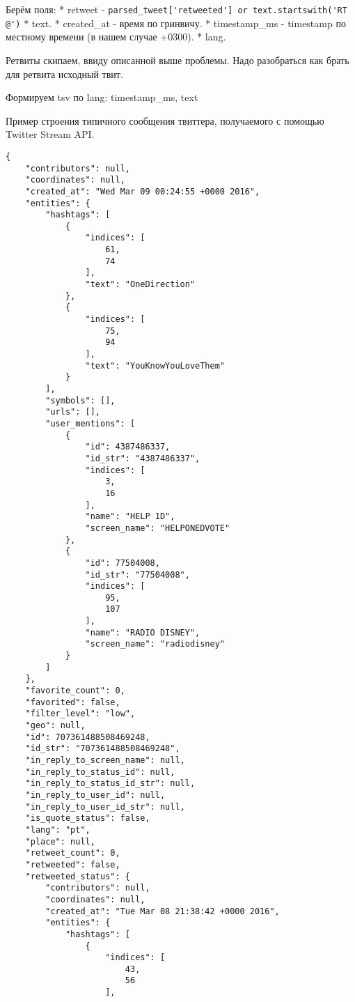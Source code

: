         Берём поля:
        * retweet - \lstinline{parsed_tweet['retweeted'] or text.startswith('RT @')}
        * text.
        * created\_at - время по гринвичу.
        * timestamp\_ms - timestamp по местному времени (в нашем случае +0300).
        * lang.

        Ретвиты скипаем, ввиду описанной выше проблемы. Надо разобраться как брать для ретвита исходный твит.

        Формируем tsv по lang:
        timestamp\_ms, text

        Пример строения типичного сообщения твиттера, получаемого с помощью Twitter Stream API.
\begin{lstlisting}
{
    "contributors": null,
    "coordinates": null,
    "created_at": "Wed Mar 09 00:24:55 +0000 2016",
    "entities": {
        "hashtags": [
            {
                "indices": [
                    61,
                    74
                ],
                "text": "OneDirection"
            },
            {
                "indices": [
                    75,
                    94
                ],
                "text": "YouKnowYouLoveThem"
            }
        ],
        "symbols": [],
        "urls": [],
        "user_mentions": [
            {
                "id": 4387486337,
                "id_str": "4387486337",
                "indices": [
                    3,
                    16
                ],
                "name": "HELP 1D",
                "screen_name": "HELPONEDVOTE"
            },
            {
                "id": 77504008,
                "id_str": "77504008",
                "indices": [
                    95,
                    107
                ],
                "name": "RADIO DISNEY",
                "screen_name": "radiodisney"
            }
        ]
    },
    "favorite_count": 0,
    "favorited": false,
    "filter_level": "low",
    "geo": null,
    "id": 707361488508469248,
    "id_str": "707361488508469248",
    "in_reply_to_screen_name": null,
    "in_reply_to_status_id": null,
    "in_reply_to_status_id_str": null,
    "in_reply_to_user_id": null,
    "in_reply_to_user_id_str": null,
    "is_quote_status": false,
    "lang": "pt",
    "place": null,
    "retweet_count": 0,
    "retweeted": false,
    "retweeted_status": {
        "contributors": null,
        "coordinates": null,
        "created_at": "Tue Mar 08 21:38:42 +0000 2016",
        "entities": {
            "hashtags": [
                {
                    "indices": [
                        43,
                        56
                    ],

\end{lstlisting}
